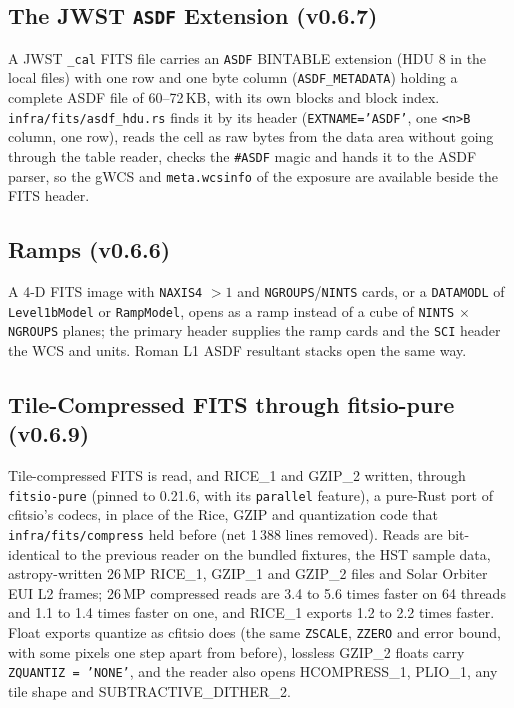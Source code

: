 \documentclass[11pt,a4paper]{article}
\newcommand{\code}[1]{\texttt{\small #1}}
\newcommand{\crate}[1]{\texttt{#1}}
\begin{document}
    \subsection{The JWST \texttt{ASDF} Extension (v0.6.7)}

    A JWST \code{\_cal} FITS file carries an \code{ASDF} BINTABLE extension (HDU 8 in the local files) with one row and one byte column (\code{ASDF\_METADATA}) holding a complete ASDF file of 60--72\,KB, with its own blocks and block index. \code{infra/fits/asdf\_hdu.rs} finds it by its header (\code{EXTNAME='ASDF'}, one \code{<n>B} column, one row), reads the cell as raw bytes from the data area without going through the table reader, checks the \code{\#ASDF} magic and hands it to the ASDF parser, so the gWCS and \code{meta.wcsinfo} of the exposure are available beside the FITS header.

    \subsection{Ramps (v0.6.6)}

    A 4-D FITS image with \code{NAXIS4} $> 1$ and \code{NGROUPS}/\code{NINTS} cards, or a \code{DATAMODL} of \code{Level1bModel} or \code{RampModel}, opens as a ramp instead of a cube of \code{NINTS} $\times$ \code{NGROUPS} planes; the primary header supplies the ramp cards and the \code{SCI} header the WCS and units. Roman L1 ASDF resultant stacks open the same way.

    \subsection{Tile-Compressed FITS through fitsio-pure (v0.6.9)}

    Tile-compressed FITS is read, and RICE\_1 and GZIP\_2 written, through \crate{fitsio-pure} (pinned to 0.21.6, with its \code{parallel} feature), a pure-Rust port of cfitsio's codecs, in place of the Rice, GZIP and quantization code that \code{infra/fits/compress} held before (net 1\,388 lines removed). Reads are bit-identical to the previous reader on the bundled fixtures, the HST sample data, astropy-written 26\,MP RICE\_1, GZIP\_1 and GZIP\_2 files and Solar Orbiter EUI L2 frames; 26\,MP compressed reads are 3.4 to 5.6 times faster on 64 threads and 1.1 to 1.4 times faster on one, and RICE\_1 exports 1.2 to 2.2 times faster. Float exports quantize as cfitsio does (the same \code{ZSCALE}, \code{ZZERO} and error bound, with some pixels one step apart from before), lossless GZIP\_2 floats carry \code{ZQUANTIZ = 'NONE'}, and the reader also opens HCOMPRESS\_1, PLIO\_1, any tile shape and SUBTRACTIVE\_DITHER\_2.
\end{document}

